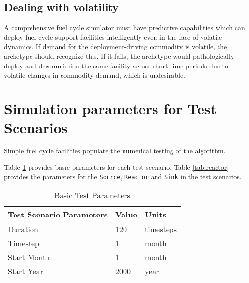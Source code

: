 \documentclass[11pt,letterpaper]{article}
\begin{document}
 \subsection{Dealing with volatility}
 \label{subsection-volatile}
A comprehensive fuel cycle simulator must have predictive capabilities which 
can deploy fuel cycle support facilities intelligently even in the face of 
volatile dynamics. If demand for the deployment-driving commodity is volatile, 
the archetype should recognize this. If it fails, the archetype would pathologically
deploy and decommission the same facility across short time periods due to volatile changes in commodity demand,
which is undesirable. 

\section{Simulation parameters for Test Scenarios}
Simple fuel cycle facilities populate the numerical testing of the algorithm.   

Table \ref{tab:testscenario} provides basic parameters for each test scenario. Table \ref{tab:reactor} provides the parameters for the \texttt{Source}, \texttt{Reactor} and \texttt{Sink} in the test scenarios.

\begin{table}[H]
	\centering
	\caption {Basic Test Parameters}
	\label{tab:testscenario}
	\begin{tabular}{|l|l|l|}
		\hline
		\textbf{Test Scenario Parameters} & \textbf{Value} & \textbf{Units} \\
		\hline
		Duration & 120 & timesteps \\
		Timestep & 1 & month \\
		Start Month & 1 & month \\
		Start Year & 2000 & year \\
		\hline
	\end{tabular}
\end{table}
\end{document}
